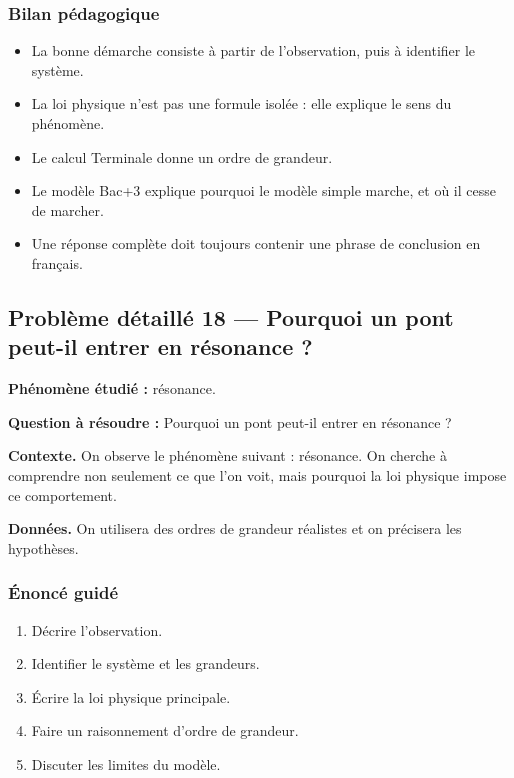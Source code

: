 \documentclass[11pt,a4paper]{article}
\begin{document}
\subsubsection*{Bilan pédagogique}

\begin{methodebox}
\begin{itemize}
  \item La bonne démarche consiste à partir de l'observation, puis à identifier le système.
  \item La loi physique n'est pas une formule isolée : elle explique le sens du phénomène.
  \item Le calcul Terminale donne un ordre de grandeur.
  \item Le modèle Bac+3 explique pourquoi le modèle simple marche, et où il cesse de marcher.
  \item Une réponse complète doit toujours contenir une phrase de conclusion en français.
\end{itemize}
\end{methodebox}

\subsection{Problème détaillé 18 — Pourquoi un pont peut-il entrer en résonance ?}

\begin{exercicebox}
\textbf{Phénomène étudié :} résonance.

\medskip
\textbf{Question à résoudre :} Pourquoi un pont peut-il entrer en résonance ?

\medskip
\textbf{Contexte.} On observe le phénomène suivant : résonance. On cherche à comprendre non seulement ce que l'on voit, mais pourquoi la loi physique impose ce comportement.

\medskip
\textbf{Données.} On utilisera des ordres de grandeur réalistes et on précisera les hypothèses.
\end{exercicebox}

\subsubsection*{Énoncé guidé}

\begin{enumerate}
  \item Décrire l'observation.
  \item Identifier le système et les grandeurs.
  \item Écrire la loi physique principale.
  \item Faire un raisonnement d'ordre de grandeur.
  \item Discuter les limites du modèle.
\end{enumerate}
\end{document}

